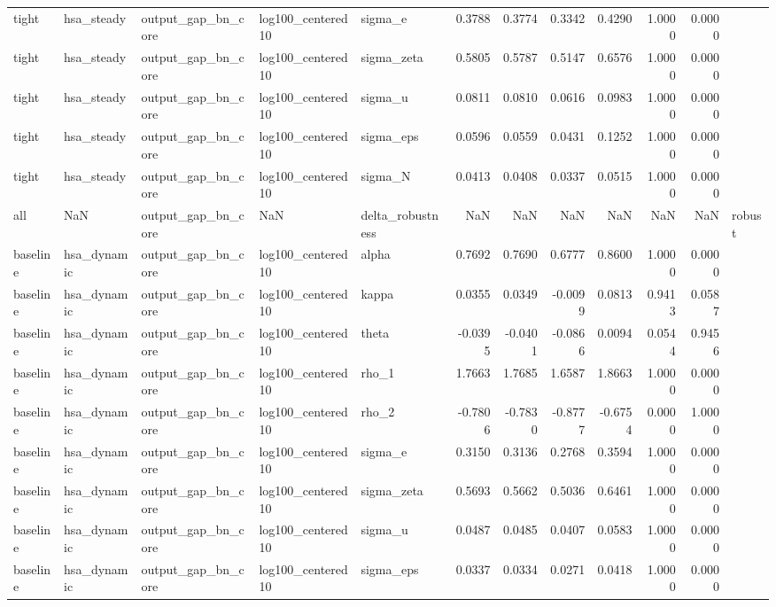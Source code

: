 \begin{tabular}{lllllrrrrrrl}
tight & hsa\_steady & output\_gap\_bn\_core & log100\_centered10 & sigma\_e & 0.3788 & 0.3774 & 0.3342 & 0.4290 & 1.0000 & 0.0000 &  \\
tight & hsa\_steady & output\_gap\_bn\_core & log100\_centered10 & sigma\_zeta & 0.5805 & 0.5787 & 0.5147 & 0.6576 & 1.0000 & 0.0000 &  \\
tight & hsa\_steady & output\_gap\_bn\_core & log100\_centered10 & sigma\_u & 0.0811 & 0.0810 & 0.0616 & 0.0983 & 1.0000 & 0.0000 &  \\
tight & hsa\_steady & output\_gap\_bn\_core & log100\_centered10 & sigma\_eps & 0.0596 & 0.0559 & 0.0431 & 0.1252 & 1.0000 & 0.0000 &  \\
tight & hsa\_steady & output\_gap\_bn\_core & log100\_centered10 & sigma\_N & 0.0413 & 0.0408 & 0.0337 & 0.0515 & 1.0000 & 0.0000 &  \\
all & NaN & output\_gap\_bn\_core & NaN & delta\_robustness & NaN & NaN & NaN & NaN & NaN & NaN & robust \\
baseline & hsa\_dynamic & output\_gap\_bn\_core & log100\_centered10 & alpha & 0.7692 & 0.7690 & 0.6777 & 0.8600 & 1.0000 & 0.0000 &  \\
baseline & hsa\_dynamic & output\_gap\_bn\_core & log100\_centered10 & kappa & 0.0355 & 0.0349 & -0.0099 & 0.0813 & 0.9413 & 0.0587 &  \\
baseline & hsa\_dynamic & output\_gap\_bn\_core & log100\_centered10 & theta & -0.0395 & -0.0401 & -0.0866 & 0.0094 & 0.0544 & 0.9456 &  \\
baseline & hsa\_dynamic & output\_gap\_bn\_core & log100\_centered10 & rho\_1 & 1.7663 & 1.7685 & 1.6587 & 1.8663 & 1.0000 & 0.0000 &  \\
baseline & hsa\_dynamic & output\_gap\_bn\_core & log100\_centered10 & rho\_2 & -0.7806 & -0.7830 & -0.8777 & -0.6754 & 0.0000 & 1.0000 &  \\
baseline & hsa\_dynamic & output\_gap\_bn\_core & log100\_centered10 & sigma\_e & 0.3150 & 0.3136 & 0.2768 & 0.3594 & 1.0000 & 0.0000 &  \\
baseline & hsa\_dynamic & output\_gap\_bn\_core & log100\_centered10 & sigma\_zeta & 0.5693 & 0.5662 & 0.5036 & 0.6461 & 1.0000 & 0.0000 &  \\
baseline & hsa\_dynamic & output\_gap\_bn\_core & log100\_centered10 & sigma\_u & 0.0487 & 0.0485 & 0.0407 & 0.0583 & 1.0000 & 0.0000 &  \\
baseline & hsa\_dynamic & output\_gap\_bn\_core & log100\_centered10 & sigma\_eps & 0.0337 & 0.0334 & 0.0271 & 0.0418 & 1.0000 & 0.0000 &  \\

\end{tabular}
